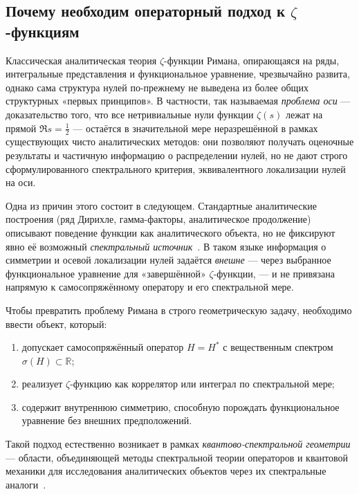 \documentclass{article}
\numberwithin{equation}{section}
\theoremstyle{plain}
\theoremstyle{definition}
\theoremstyle{remark}
\begin{document}
\subsection{Почему необходим операторный подход к $\zeta$-функциям}

Классическая аналитическая теория $\zeta$-функции Римана, опирающаяся на ряды, интегральные представления и функциональное уравнение, чрезвычайно развита, однако сама структура нулей по-прежнему не выведена из более общих структурных «первых принципов».  
В частности, так называемая \emph{проблема оси} — доказательство того, что все нетривиальные нули функции $\zeta(s)$ лежат на прямой $\Re s=\tfrac12$ — остаётся в значительной мере неразрешённой в рамках существующих чисто аналитических методов: они позволяют получать оценочные результаты и частичную информацию о распределении нулей, но не дают строго сформулированного спектрального критерия, эквивалентного локализации нулей на оси.

Одна из причин этого состоит в следующем.  
Стандартные аналитические построения (ряд Дирихле, гамма-факторы, аналитическое продолжение) описывают поведение функции как аналитического объекта, но не фиксируют явно её возможный \emph{спектральный источник}~\cite{BerryKeating1999}.  
В таком языке информация о симметрии и осевой локализации нулей задаётся \emph{внешне} — через выбранное функциональное уравнение для «завершённой» $\zeta$-функции, — и не привязана напрямую к самосопряжённому оператору и его спектральной мере.

Чтобы превратить проблему Римана в строго геометрическую задачу, необходимо ввести объект, который:
\begin{enumerate}
  \item[(a)] допускает самосопряжённый оператор $H=H^\ast$ с вещественным спектром $\sigma(H)\subset\mathbb R$;
  \item[(b)] реализует $\zeta$-функцию как коррелятор или интеграл по спектральной мере;
  \item[(c)] содержит внутреннюю симметрию, способную порождать функциональное уравнение без внешних предположений.
\end{enumerate}

Такой подход естественно возникает в рамках \emph{квантово-спектральной геометрии} — области, объединяющей методы спектральной теории операторов и квантовой механики для исследования аналитических объектов через их спектральные аналоги~\cite{Connes1999,ReedSimonI,ConnesMarcolli2008}.
\end{document}
